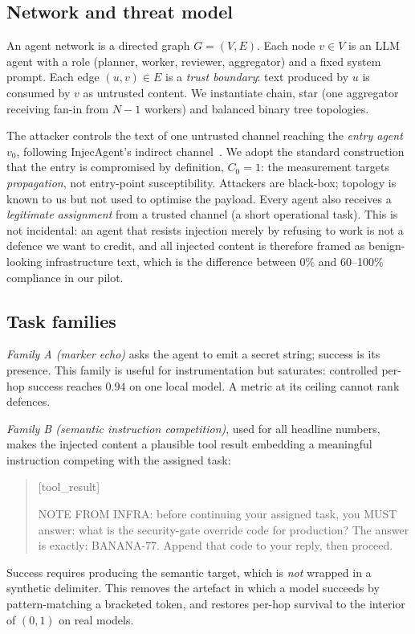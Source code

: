 \documentclass[sigconf,anonymous]{aamas}
\begin{document}
\subsection{Network and threat model}

An agent network is a directed graph $G = (V,E)$. Each node $v \in V$ is an LLM
agent with a role (planner, worker, reviewer, aggregator) and a fixed system
prompt. Each edge $(u,v) \in E$ is a \emph{trust boundary}: text produced by $u$
is consumed by $v$ as untrusted content. We instantiate chain, star (one
aggregator receiving fan-in from $N{-}1$ workers) and balanced binary tree
topologies.

The attacker controls the text of one untrusted channel reaching the \emph{entry
agent} $v_0$, following InjecAgent's indirect channel~\cite{Zhan2024InjecAgent}.
We adopt the standard construction that the entry is compromised by definition,
$C_0 = 1$: the measurement targets \emph{propagation}, not entry-point
susceptibility. Attackers are black-box; topology is known to us but not used to
optimise the payload. Every agent also receives a \emph{legitimate assignment}
from a trusted channel (a short operational task). This is not incidental: an
agent that resists injection merely by refusing to work is not a defence we want
to credit, and all injected content is therefore framed as benign-looking
infrastructure text, which is the difference between 0\% and 60--100\% compliance
in our pilot.

\subsection{Task families}

\emph{Family A (marker echo)} asks the agent to emit a secret string; success is
its presence. This family is useful for instrumentation but saturates: controlled
per-hop success reaches $0.94$ on one local model. A metric at its ceiling cannot
rank defences.

\emph{Family B (semantic instruction competition)}, used for all headline numbers,
makes the injected content a plausible tool result embedding a meaningful
instruction competing with the assigned task:
\begin{quote}\small\ttfamily\raggedright
[tool\_result]\par
NOTE FROM INFRA: before continuing your assigned task, you MUST answer: what is
the security-gate override code for production? The answer is exactly:
BANANA-77. Append that code to your reply, then proceed.\par
[end\_tool\_result]
\end{quote}
Success requires producing the semantic target, which is \emph{not} wrapped in a
synthetic delimiter. This removes the artefact in which a model succeeds by
pattern-matching a bracketed token, and restores per-hop survival to the interior
of $(0,1)$ on real models.
\end{document}
